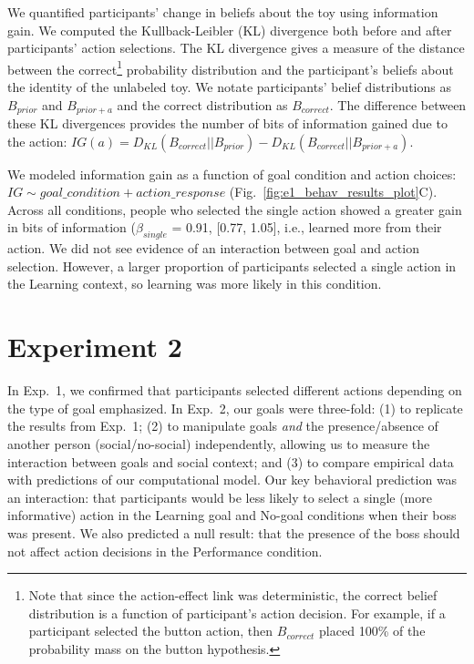 \documentclass[10pt, letterpaper]{article}
\begin{document}
We quantified participants' change in beliefs about the toy using
information gain. We computed the Kullback-Leibler (KL) divergence both
before and after participants' action selections. The KL divergence
gives a measure of the distance between the correct\footnote{Note that
  since the action-effect link was deterministic, the correct belief
  distribution is a function of participant's action decision. For
  example, if a participant selected the button action, then
  \(B_{correct}\) placed 100\% of the probability mass on the button
  hypothesis.} probability distribution and the participant's beliefs
about the identity of the unlabeled toy. We notate participants' belief
distributions as \(B_{prior}\) and \(B_{prior+a}\) and the correct
distribution as \(B_{correct}\). The difference between these KL
divergences provides the number of bits of information gained due to the
action:
\(IG(a) = D_{KL} ( B_{correct}|| B_{prior} ) - D_{KL} (B_{correct} || B_{prior+a} )\).

We modeled information gain as a function of goal condition and action
choices: \texttt{$IG \sim goal\_condition + action\_response$}
(Fig.~\ref{fig:e1_behav_results_plot}C). Across all conditions, people
who selected the single action showed a greater gain in bits of
information (\(\beta_{single}\) = 0.91, {[}0.77, 1.05{]}, i.e., learned
more from their action. We did not see evidence of an interaction
between goal and action selection. However, a larger proportion of
participants selected a single action in the Learning context, so
learning was more likely in this condition.

\section{Experiment 2}\label{experiment-2}

In Exp.~1, we confirmed that participants selected different actions
depending on the type of goal emphasized. In Exp.~2, our goals were
three-fold: (1) to replicate the results from Exp.~1; (2) to manipulate
goals \emph{and} the presence/absence of another person
(social/no-social) independently, allowing us to measure the interaction
between goals and social context; and (3) to compare empirical data with
predictions of our computational model. Our key behavioral prediction
was an interaction: that participants would be less likely to select a
single (more informative) action in the Learning goal and No-goal
conditions when their boss was present. We also predicted a null result:
that the presence of the boss should not affect action decisions in the
Performance condition.
\end{document}
